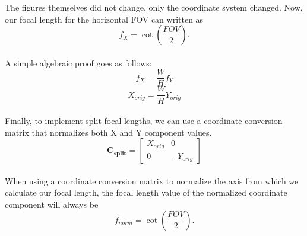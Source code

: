 \documentclass[11.pt]{article}
\begin{document}
The figures themselves did not change, only the coordinate system changed. Now, our focal 
length for the horizontal FOV can written as\\

$$f_{X} =\cot\left( \frac{FOV}{2} \right)\text{.}$$\\

A simple algebraic proof goes as follows:\\

$$f_{X} = \frac{W}{H}f_{Y}$$
$$X_{orig} = \frac{W}{H}Y_{orig}$$\\

Finally, to implement split focal lengths, we can use a coordinate conversion matrix that
normalizes both X and Y component values.\\

$$ \mathbf{C_{split}} = \begin{bmatrix}  X_{orig} &      0    \\
                                     0    & -Y_{orig} \end{bmatrix} $$\\

When using a coordinate conversion matrix to normalize the axis from which we calculate
our focal length, the focal length value of the normalized coordinate component will 
always be\\

$$f_{norm} = \cot\left( \frac{FOV}{2} \right)\text{.}$$
\end{document}
